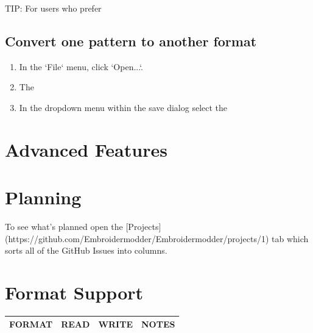 \documentclass{report}
\begin{document}
TIP: For users who prefer

\subsection{Convert one pattern to another format}

\begin{enumerate}
\item In the `File` menu, click `Open...`.
\item The 
\item In the dropdown menu within the save dialog select the 
\end{enumerate}

\section{Advanced Features}


\section{Planning}

To see what's planned open the [Projects](https://github.com/Embroidermodder/Embroidermodder/projects/1) tab which sorts all of the GitHub Issues into columns.

\section{Format Support}

\begin{tabular}{l l l l}
FORMAT & READ & WRITE & NOTES \\
\hline
\end{tabular}
\end{document}
